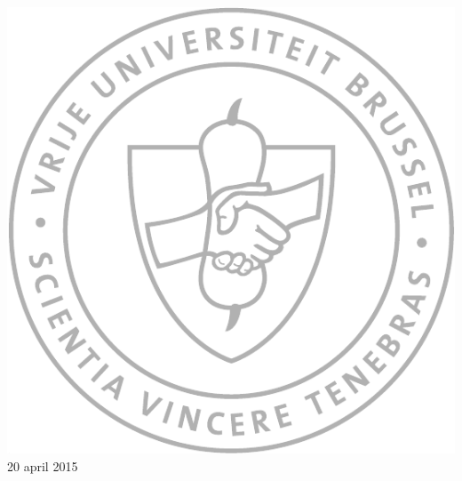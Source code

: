 \begin{titlepage}
\vspace{0.6cm}

\includegraphics[scale=0.4]{VUB_schild.pdf}\\[0.5cm]

{\large 20 april 2015}
\vfill %

\end{titlepage}